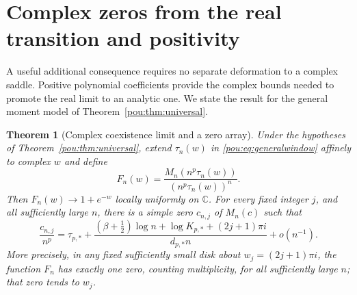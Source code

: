 \documentclass[11pt]{article}
\newtheorem{theorem}{Theorem}[section]
\theoremstyle{definition}
\theoremstyle{remark}
\begin{document}
\section{Complex zeros from the real transition and positivity}
\label{pou:sec:zeros}

A useful additional consequence requires no separate deformation to a
complex saddle.  Positive polynomial coefficients provide the complex
bounds needed to promote the real limit to an analytic one.
We state the result for the general moment model of
Theorem~\ref{pou:thm:universal}.

\begin{theorem}[Complex coexistence limit and a zero array]
\label{pou:thm:zeros}
Under the hypotheses of Theorem~\ref{pou:thm:universal}, extend
$\tau_n(w)$ in \eqref{pou:eq:generalwindow} affinely to complex $w$ and define
\[
 F_n(w)=\frac{M_n(n^p\tau_n(w))}{(n^p\tau_n(w))^n}.
\]
Then $F_n(w)\to1+e^{-w}$ locally uniformly on $\mathbb C$.
For every fixed integer $j$, and all sufficiently large $n$, there is a
simple zero $c_{n,j}$ of $M_n(c)$ such that
\begin{equation}\label{pou:eq:complexzeros}
 \frac{c_{n,j}}{n^p}=\tau_{p,*}+
 \frac{(\beta+\tfrac12)\log n+\log K_{p,*}+(2j+1)\pi i}
      {d_{p,*}n}+o(n^{-1}).
\end{equation}
More precisely, in any fixed sufficiently small disk about
$w_j=(2j+1)\pi i$, the function $F_n$ has exactly one zero, counting
multiplicity, for all sufficiently large $n$; that zero tends to $w_j$.
\end{theorem}
\end{document}

